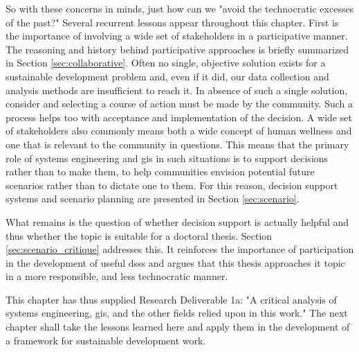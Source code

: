 So with these concerns in minds, just how can we "avoid the technocratic excesses of the past?" Several recurrent lessons appear throughout this chapter. First is the importance of involving a wide set of stakeholders in a participative manner. The reasoning and history behind participative approaches is briefly summarized in Section \ref{sec:collaborative}. Often no single, objective solution exists for a sustainable development problem and, even if it did, our data collection and analysis methods are insufficient to reach it. In absence of such a single solution, consider and selecting a course of action must be made by the community. Such a process helps too with acceptance and implementation of the decision. A wide set of stakeholders also commonly means both a wide concept of human wellness and one that is relevant to the community in questions. This means that the primary role of systems engineering and \ac{gis} in such situations is to support decisions rather than to make them, to help communities envision potential future scenarios rather than to dictate one to them. For this reason, decision support systems and scenario planning are presented in Section \ref{sec:scenario}.

What remains is the question of whether decision support is actually helpful and thus whether the topic is suitable for a doctoral thesis. Section \ref{sec:scenario_critique} addresses this. It reinforces the importance of participation in the development of useful \acp{dss} and argues that this thesis approaches it topic in a more responsible, and less technocratic manner. 

This chapter has thus supplied Research Deliverable 1a: "A critical analysis of systems engineering, \ac{gis}, and the other fields relied upon in this work." The next chapter shall take the lessons learned here and apply them in the development of a framework for sustainable development work.